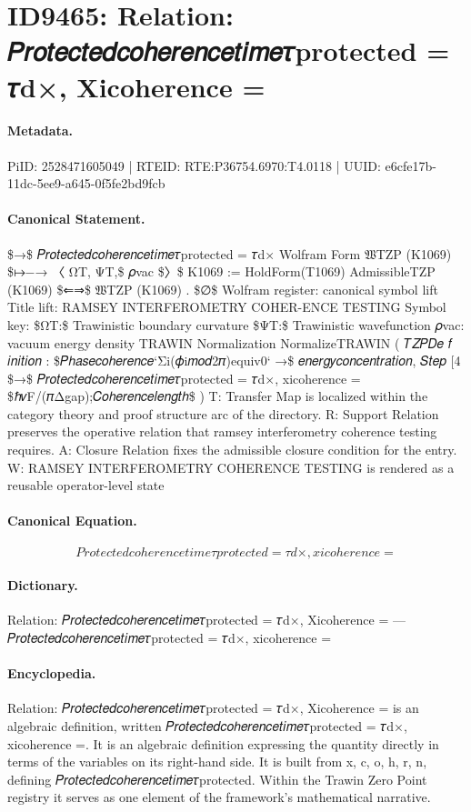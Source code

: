 \section*{ID9465: Relation: 𝑃𝑟𝑜𝑡𝑒𝑐𝑡𝑒𝑑𝑐𝑜ℎ𝑒𝑟𝑒𝑛𝑐𝑒𝑡𝑖𝑚𝑒𝜏protected = 𝜏d×, Xicoherence =}
\paragraph{Metadata.}
PiID: 2528471605049 | RTEID: RTE:P36754.6970:T4.0118 | UUID: e6cfe17b-11dc-5ee9-a645-0f5fe2bd9fcb

\paragraph{Canonical Statement.}
\$→\$ 𝑃𝑟𝑜𝑡𝑒𝑐𝑡𝑒𝑑𝑐𝑜ℎ𝑒𝑟𝑒𝑛𝑐𝑒𝑡𝑖𝑚𝑒𝜏protected = 𝜏d× Wolfram Form 𝔚TZP (K1069) \$↦−→ 〈 ΩT, ΨT,\$ 𝜌vac \$〉\$ K1069 := HoldForm(T1069) AdmissibleTZP (K1069) \$⇐⇒\$ 𝔚TZP (K1069) . \$∅\$ Wolfram register: canonical symbol lift Title lift: RAMSEY INTERFEROMETRY COHER-ENCE TESTING Symbol key: \$ΩT:\$ Trawinistic boundary curvature \$ΨT:\$ Trawinistic wavefunction 𝜌vac: vacuum energy density TRAWIN Normalization NormalizeTRAWIN ( 𝑇𝑍𝑃𝐷𝑒 𝑓 𝑖𝑛𝑖𝑡𝑖𝑜𝑛 : \$𝑃ℎ𝑎𝑠𝑒𝑐𝑜ℎ𝑒𝑟𝑒𝑛𝑐𝑒‘Σi(𝜙i𝑚𝑜𝑑2𝜋)equiv0‘ →\$ 𝑒𝑛𝑒𝑟𝑔𝑦𝑐𝑜𝑛𝑐𝑒𝑛𝑡𝑟𝑎𝑡𝑖𝑜𝑛, 𝑆𝑡𝑒𝑝 [4 \$→\$ 𝑃𝑟𝑜𝑡𝑒𝑐𝑡𝑒𝑑𝑐𝑜ℎ𝑒𝑟𝑒𝑛𝑐𝑒𝑡𝑖𝑚𝑒𝜏protected = 𝜏d×, xicoherence = \$ℏ𝑣F/(𝜋Δgap);𝐶𝑜ℎ𝑒𝑟𝑒𝑛𝑐𝑒𝑙𝑒𝑛𝑔𝑡ℎ\$ ) T: Transfer Map is localized within the category theory and proof structure arc of the directory. R: Support Relation preserves the operative relation that ramsey interferometry coherence testing requires. A: Closure Relation fixes the admissible closure condition for the entry. W: RAMSEY INTERFEROMETRY COHERENCE TESTING is rendered as a reusable operator-level state

\paragraph{Canonical Equation.}
\[
𝑃𝑟𝑜𝑡𝑒𝑐𝑡𝑒𝑑𝑐𝑜ℎ𝑒𝑟𝑒𝑛𝑐𝑒𝑡𝑖𝑚𝑒𝜏protected = 𝜏d×, xicoherence =
\]

\paragraph{Dictionary.}
Relation: 𝑃𝑟𝑜𝑡𝑒𝑐𝑡𝑒𝑑𝑐𝑜ℎ𝑒𝑟𝑒𝑛𝑐𝑒𝑡𝑖𝑚𝑒𝜏protected = 𝜏d×, Xicoherence = — 𝑃𝑟𝑜𝑡𝑒𝑐𝑡𝑒𝑑𝑐𝑜ℎ𝑒𝑟𝑒𝑛𝑐𝑒𝑡𝑖𝑚𝑒𝜏protected = 𝜏d×, xicoherence =

\paragraph{Encyclopedia.}
Relation: 𝑃𝑟𝑜𝑡𝑒𝑐𝑡𝑒𝑑𝑐𝑜ℎ𝑒𝑟𝑒𝑛𝑐𝑒𝑡𝑖𝑚𝑒𝜏protected = 𝜏d×, Xicoherence = is an algebraic definition, written 𝑃𝑟𝑜𝑡𝑒𝑐𝑡𝑒𝑑𝑐𝑜ℎ𝑒𝑟𝑒𝑛𝑐𝑒𝑡𝑖𝑚𝑒𝜏protected = 𝜏d×, xicoherence =. It is an algebraic definition expressing the quantity directly in terms of the variables on its right-hand side. It is built from x, c, o, h, r, n, defining 𝑃𝑟𝑜𝑡𝑒𝑐𝑡𝑒𝑑𝑐𝑜ℎ𝑒𝑟𝑒𝑛𝑐𝑒𝑡𝑖𝑚𝑒𝜏protected. Within the Trawin Zero Point registry it serves as one element of the framework's mathematical narrative.
